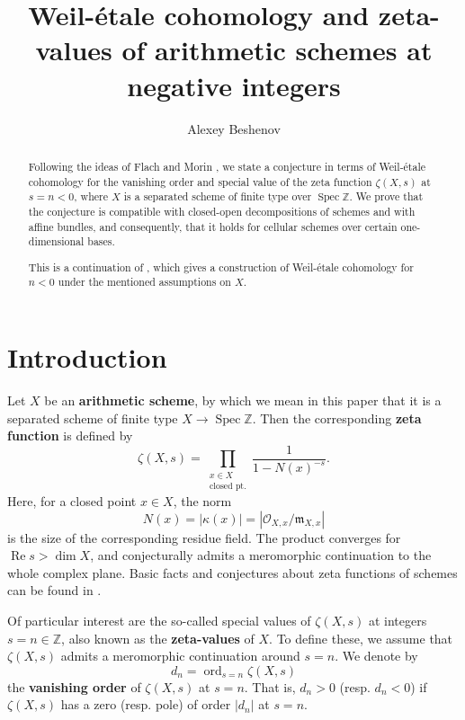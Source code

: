 \documentclass[10pt,a4paper,oneside]{article}
\title{Weil-\'{e}tale cohomology and zeta-values of arithmetic schemes at negative integers}
\author{Alexey Beshenov}
\date{}
\DeclareMathOperator{\ord}{ord}
\DeclareMathOperator{\Spec}{Spec}
\newcommand{\ZZ}{\mathbb{Z}}
\renewcommand{\Re}{\operatorname{Re}}
\theoremstyle{myplain}
\theoremstyle{mydefinition}
\numberwithin{equation}{section}
\begin{document}
\maketitle

\begin{abstract}
  Following the ideas of Flach and Morin \cite{Flach-Morin-2018}, we state a
  conjecture in terms of Weil-\'{e}tale cohomology for the vanishing order and
  special value of the zeta function $\zeta (X,s)$ at $s = n < 0$, where $X$ is
  a separated scheme of finite type over $\Spec \ZZ$. We prove that the
  conjecture is compatible with closed-open decompositions of schemes and with
  affine bundles, and consequently, that it holds for cellular schemes over
  certain one-dimensional bases.

  This is a continuation of \cite{Beshenov-Weil-etale-1}, which gives a
  construction of Weil-\'{e}tale cohomology for $n<0$ under the mentioned
  assumptions on $X$.
\end{abstract}



\section{Introduction}

Let $X$ be an \textbf{arithmetic scheme}, by which we mean in this paper that it
is a separated scheme of finite type $X \to \Spec \ZZ$. Then the corresponding
\textbf{zeta function} is defined by
\begin{equation}
  \label{eqn:Euler-product-for-zeta}
  \zeta (X,s) = \prod_{\substack{x \in X \\ \text{closed pt.}}}
  \frac{1}{1 - N (x)^{-s}}.
\end{equation}
Here, for a closed point $x \in X$, the norm
$$N (x) = |\kappa (x)| = |\mathcal{O}_{X,x}/\mathfrak{m}_{X,x}|$$
is the size of the corresponding residue field. The product converges for
$\Re s > \dim X$, and conjecturally admits a meromorphic continuation to the
whole complex plane. Basic facts and conjectures about zeta functions of schemes
can be found in \cite{Serre-1965}.

Of particular interest are the so-called special values of $\zeta (X,s)$ at
integers $s = n \in \ZZ$, also known as the \textbf{zeta-values} of $X$.
To define these, we assume that $\zeta (X,s)$ admits a meromorphic continuation
around $s = n$. We denote by
$$d_n = \ord_{s=n} \zeta (X,s)$$
the \textbf{vanishing order} of $\zeta (X,s)$ at $s = n$. That is, $d_n > 0$
(resp. $d_n < 0$) if $\zeta (X,s)$ has a zero (resp. pole) of order $|d_n|$ at
$s = n$.
\end{document}
